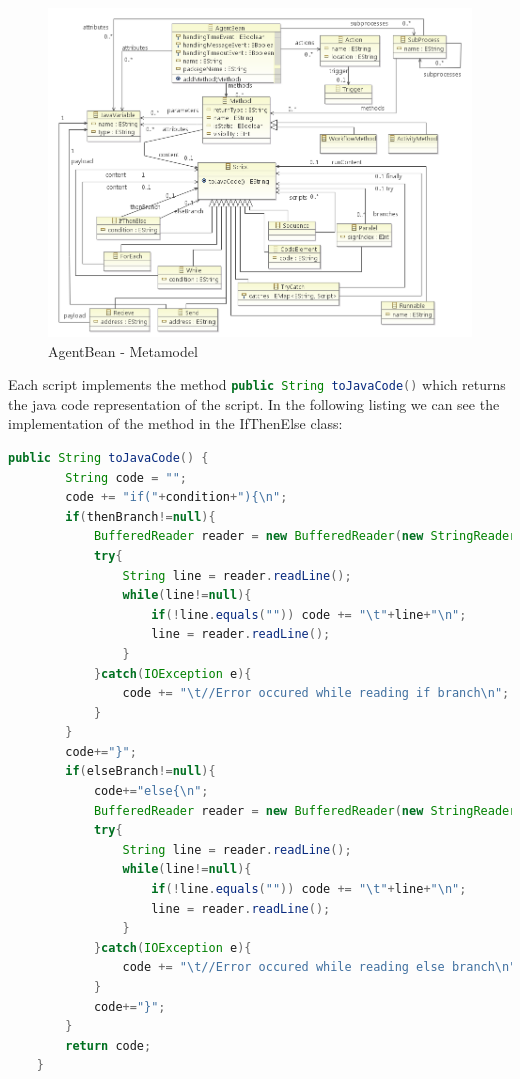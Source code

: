\begin{figure}[h]
	\centering\includegraphics[width=1.0\textwidth]{images/agentBean_metamodel.png}
	\caption{AgentBean - Metamodel}
	\label{fig:agentbean_metamodel}
\end{figure}
\newpage
Each script implements the method \lstinline[language=Java]{public String toJavaCode()} which returns the java code representation of the script.
In the following listing we can see the implementation of the method in the IfThenElse class:
\begin{lstlisting}[language = Java, caption = toJavaCode() implementation in the IfThenElse class]
	public String toJavaCode() {
		String code = "";
		code += "if("+condition+"){\n";
		if(thenBranch!=null){
			BufferedReader reader = new BufferedReader(new StringReader(thenBranch.toJavaCode()));
			try{
				String line = reader.readLine();
				while(line!=null){
					if(!line.equals("")) code += "\t"+line+"\n";
					line = reader.readLine();
				}
			}catch(IOException e){
				code += "\t//Error occured while reading if branch\n";
			}
		}
		code+="}";
		if(elseBranch!=null){
			code+="else{\n";
			BufferedReader reader = new BufferedReader(new StringReader(elseBranch.toJavaCode()));
			try{
				String line = reader.readLine();
				while(line!=null){
					if(!line.equals("")) code += "\t"+line+"\n";
					line = reader.readLine();
				}
			}catch(IOException e){
				code += "\t//Error occured while reading else branch\n";
			}
			code+="}";
		}
		return code;
	}
\end{lstlisting}

